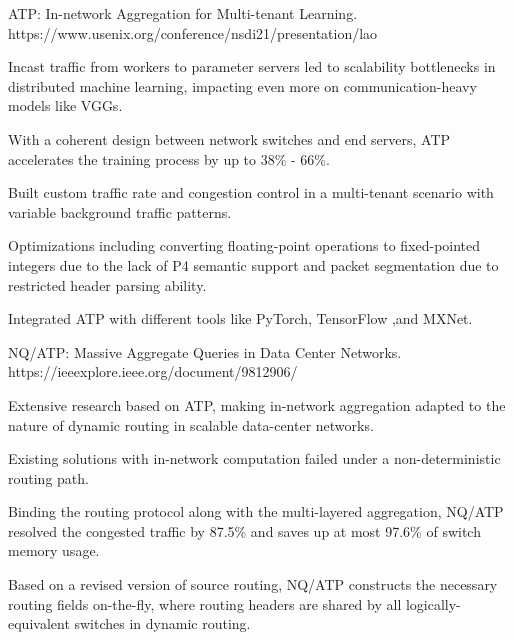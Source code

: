 \begin{cventries}
  \cventry
    {} %
    {ATP: In-network Aggregation for Multi-tenant Learning.} %
    {} %
    {https://www.usenix.org/conference/nsdi21/presentation/lao} %
    {
      \vspace{-2mm}
      \begin{cvitems} %
        \item {Incast traffic from workers to parameter servers led to scalability bottlenecks in distributed machine learning, impacting even more on communication-heavy models like VGGs.}
        \item {With a coherent design between network switches and end servers, ATP accelerates the training process by up to 38\% - 66\%.}
        \item {Built custom traffic rate and congestion control in a multi-tenant scenario with variable background traffic patterns.}
        \item {Optimizations including converting floating-point operations to fixed-pointed integers due to the lack of P4 semantic support and packet segmentation due to restricted header parsing ability.}
        \item {Integrated ATP with different tools like PyTorch, TensorFlow ,and MXNet.}
      \end{cvitems}
    }

    \vspace{-3mm}
  
    \cventry
      {} %
      {NQ/ATP: Massive Aggregate Queries in Data Center Networks.} %
      {} %
      {https://ieeexplore.ieee.org/document/9812906/} %
      {
        \vspace{-2mm}
        \begin{cvitems} %
          \item {Extensive research based on ATP, making in-network aggregation adapted to the nature of dynamic routing in scalable data-center networks.}
          \item {Existing solutions with in-network computation failed under a non-deterministic routing path.}
          \item {Binding the routing protocol along with the multi-layered aggregation, NQ/ATP resolved the congested traffic by 87.5\% and saves up at most 97.6\% of switch memory usage.}
          \item {Based on a revised version of source routing, NQ/ATP constructs the necessary routing fields on-the-fly, where routing headers are shared by all logically-equivalent switches in dynamic routing.}
        \end{cvitems}
      }


\end{cventries}
